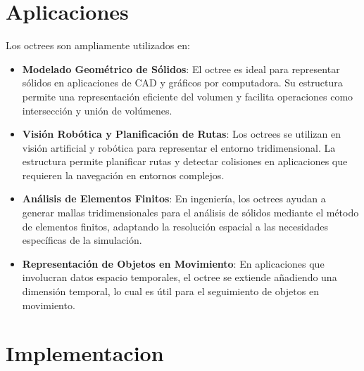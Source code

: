 \documentclass{article}
\begin{document}
\section{Aplicaciones}
Los octrees son ampliamente utilizados en:
\begin{itemize}
    \item \textbf{Modelado Geométrico de Sólidos}: El octree es ideal para representar sólidos en aplicaciones de CAD y gráficos por computadora. Su estructura permite una representación eficiente del volumen y facilita operaciones como intersección y unión de volúmenes.
    \item \textbf{Visión Robótica y Planificación de Rutas}: Los octrees se utilizan en visión artificial y robótica para representar el entorno tridimensional. La estructura permite planificar rutas y detectar colisiones en aplicaciones que requieren la navegación en entornos complejos.
    \item \textbf{Análisis de Elementos Finitos}: En ingeniería, los octrees ayudan a generar mallas tridimensionales para el análisis de sólidos mediante el método de elementos finitos, adaptando la resolución espacial a las necesidades específicas de la simulación.
    \item \textbf{Representación de Objetos en Movimiento}: En aplicaciones que involucran datos espacio temporales, el octree se extiende añadiendo una dimensión temporal, lo cual es útil para el seguimiento de objetos en movimiento.
\end{itemize}
\section{Implementacion}
\end{document}
